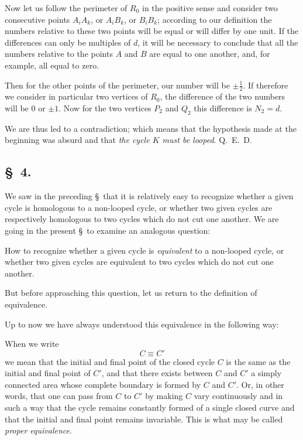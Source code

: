 \documentclass{article}
\begin{document}
Now let us follow the perimeter of $R_{0}$ in the positive sense and consider two consecutive points $A_{i}A_{k}$, or $A_{i}B_{k}$, or $B_{i}B_{k}$; according to our definition the numbers relative to these two points will be equal or will differ by one unit. If the differences can only be multiples of $d$, it will be necessary to conclude that all the numbers relative to the points $A$ and $B$ are equal to one another, and, for example, all equal to zero.

Then for the other points of the perimeter, our number will be $\pm \frac{1}{2}$. If therefore we consider in particular two vertices of $R_{0}$, the difference of the two numbers will be 0 or $\pm 1$. Now for the two vertices $P_{2}$ and $Q_{2}$ this difference is $N_{2} = d$.

We are thus led to a contradiction; which means that the hypothesis made at the beginning was absurd and that \emph{the cycle $K$ must be looped}. Q.~E.~D.

\subsection*{\S~4.}

We saw in the preceding \S\ that it is relatively easy to recognize whether a given cycle is homologous to a non-looped cycle, or whether two given cycles are respectively homologous to two cycles which do not cut one another. We are going in the present \S\ to examine an analogous question:

How to recognize whether a given cycle is \emph{equivalent} to a non-looped cycle, or whether two given cycles are equivalent to two cycles which do not cut one another.

But before approaching this question, let us return to the definition of equivalence.

Up to now we have always understood this equivalence in the following way:


When we write
\[ C \equiv C' \]
we mean that the initial and final point of the closed cycle $C$ is the same as the initial and final point of $C'$, and that there exists between $C$ and $C'$ a simply connected area whose complete boundary is formed by $C$ and $C'$. Or, in other words, that one can pass from $C$ to $C'$ by making $C$ vary continuously and in such a way that the cycle remains constantly formed of a single closed curve and that the initial and final point remains invariable. This is what may be called \emph{proper equivalence}.
\end{document}
